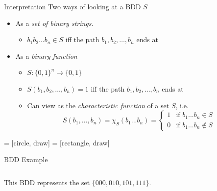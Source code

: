 \documentclass{beamer}
\begin{document}
\begin{frame}{Interpretation}
Two ways of looking at a BDD $S$
\begin{itemize}
\item As a \emph{set of binary strings}.
  \begin{itemize}
    \item $b_1b_2 \dots b_n \in S$ iff the path $b_1, b_2, \dots, b_n$ ends at 
  \end{itemize}
\item As a \emph{binary function}
    \begin{itemize}
    \item $S: \{0, 1\}^n \rightarrow \{0, 1\}$
    \item $S(b_1, b_2, \dots, b_n) = 1$ iff the path $b_1, b_2, \dots, b_n$ ends at 
    \item Can view as the \emph{characteristic function} of a set $S$, i.e.
    $$ S(b_1, ..., b_n) = \chi_S(b_1...b_n) = \begin{cases}
      1 & \text{if } b_1...b_n \in S \\
      0 & \text{if } b_1...b_n \not \in S
    \end{cases}$$
    \end{itemize}
\end{itemize}
\end{frame}

 = [circle, draw]
 = [rectangle, draw]
                  
\begin{frame}{BDD Example}
\begin{columns}
\column{2.5in}
\column{1.5in}
This BDD represents the set $\{000, 010, 101, 111\}$.
\end{columns}
\end{frame}
\end{document}
